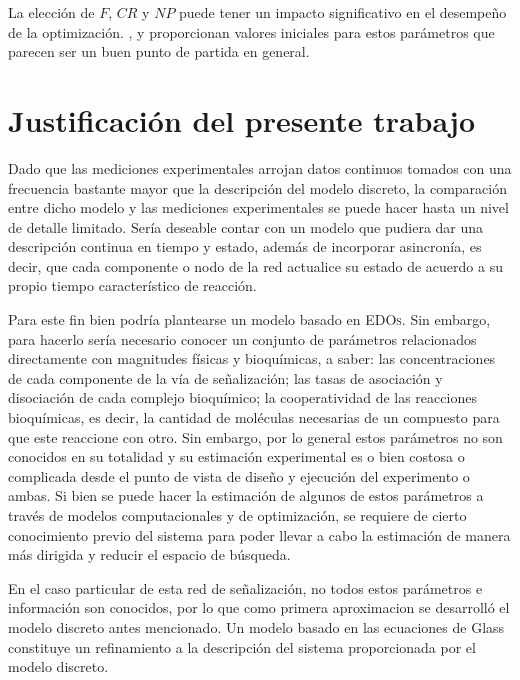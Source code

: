 La elección de $F$, $CR$ y $NP$ puede tener un impacto significativo en el desempeño de la optimización. \citeauthor{Storn1997}  \citep{Storn1997}, y \citeauthor{lampinen2002} \citep{lampinen2002} proporcionan valores iniciales para estos parámetros que parecen ser un buen punto de partida en general.

\section{Justificación del presente trabajo}

Dado que las mediciones experimentales arrojan datos continuos tomados con una frecuencia bastante mayor que la descripción del modelo discreto, la comparación entre dicho modelo y las mediciones experimentales se puede hacer hasta un nivel de detalle limitado. Sería deseable contar con un modelo que pudiera dar una descripción continua en tiempo y estado, además de incorporar asincronía, es decir, que cada componente o nodo de la red actualice su estado de acuerdo a su propio tiempo característico de reacción.

Para este fin bien podría plantearse un modelo basado en \textsc{EDOs}. Sin embargo, para hacerlo sería necesario conocer un conjunto de parámetros relacionados directamente con magnitudes físicas y bioquímicas, a saber: las concentraciones de cada componente de la vía de señalización; las tasas de asociación y disociación de cada complejo bioquímico; la cooperatividad de las reacciones bioquímicas, es decir, la cantidad de moléculas necesarias de un compuesto para que este reaccione con otro. Sin embargo, por lo general estos parámetros no son conocidos en su totalidad y su estimación experimental es o bien costosa o complicada desde el punto de vista de diseño y ejecución del experimento o ambas. Si bien se puede hacer la estimación de algunos de estos parámetros a través de modelos computacionales y de optimización, se requiere de cierto conocimiento previo del sistema para poder llevar a cabo la estimación de manera más dirigida y reducir el espacio de búsqueda.

En el caso particular de esta red de señalización, no todos estos parámetros e información son conocidos, por lo que como primera aproximacion se desarrolló el modelo discreto antes mencionado. Un modelo basado en las ecuaciones de Glass constituye un refinamiento a la descripción del sistema proporcionada por el modelo discreto.

